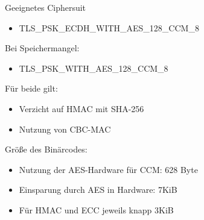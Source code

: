 \documentclass{beamer}
\begin{document}
\begin{frame}{Geeignetes Ciphersuit}
  \begin{itemize}
    \item TLS\_PSK\_ECDH\_WITH\_AES\_128\_CCM\_8
  \end{itemize}
  Bei Speichermangel:
  \begin{itemize}
    \item TLS\_PSK\_WITH\_AES\_128\_CCM\_8
  \end{itemize}
  Für beide gilt:
  \begin{itemize}
    \item Verzicht auf HMAC mit SHA-256
    \item Nutzung von CBC-MAC
  \end{itemize}
  Größe des Binärcodes:
  \begin{itemize}
    \item Nutzung der AES-Hardware für CCM: 628 Byte
    \item Einsparung durch AES in Hardware: 7KiB
    \item Für HMAC und ECC jeweils knapp 3KiB
  \end{itemize}
\end{frame}
\end{document}

